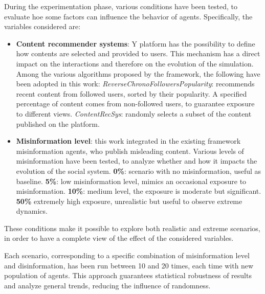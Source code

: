 \medskip
During the experimentation phase, various conditions have been tested, to evaluate hoe some factors can influence the behavior of agents.
Specifically, the variables considered are:
\begin{itemize}
    \item \textbf{Content recommender systems}: Y platform has the possibility to define how contents are selected and provided to users.
    This mechanism has a direct impact on the interactions and therefore on the evolution of the simulation.
    Among the various algorithms proposed by the framework, the following have been adopted in this work:
        \subitem \textit{ReverseChronoFollowersPopularity}: recommends recent content from followed users, sorted by their popularity. A specified percentage of content comes from non-followed users, to guarantee exposure to different views.
        \subitem \textit{ContentRecSys}: randomly selects a subset of the content published on the platform.
    \item \textbf{Misinformation level}: this work integrated in the existing framework misinformation agents, who publish misleading content. 
    Various levels of misinformation have been tested, to analyze whether and how it impacts the evolution of the social system.
        \subitem \textbf{0\%}: scenario with no misinformation, useful as baseline.
        \subitem \textbf{5\%}: low misinformation level, mimics an occasional exposure to misinformation.
        \subitem \textbf{10\%}: medium level, the exposure is moderate but significant.
        \subitem \textbf{50\%} extremely high exposure, unrealistic but useful to observe extreme dynamics.
\end{itemize}

These conditions make it possible to explore both realistic and extreme scenarios, in order to have a complete view of the effect of the considered variables.

\medskip
Each scenario, corresponding to a specific combination of misinformation level and disinformation, has been run between 10 and 20 times, each time with new population of agents.
This approach guarantees statistical robustness of results and analyze general trends, reducing the influence of randomness. 

